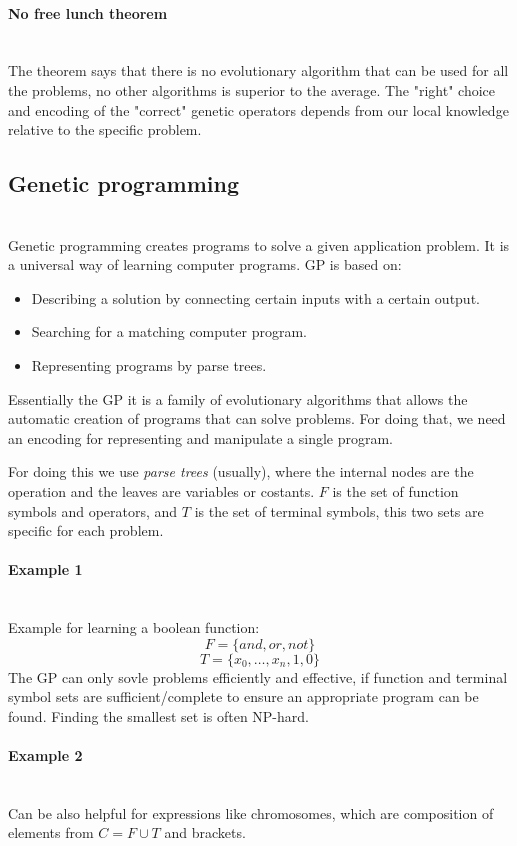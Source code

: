 \documentclass{article}
\begin{document}
\paragraph{No free lunch theorem}\mbox{}\\
The theorem says that there is no evolutionary algorithm that can be used for all the problems,
no other algorithms is superior to the average. The "right" choice and encoding of the
"correct" genetic operators depends from our local knowledge relative to the specific problem.

\subsection{Genetic programming}\mbox{}\\
Genetic programming creates programs to solve a given application problem. It is a universal way
of learning computer programs. GP is based on:
\begin{itemize}
    \item Describing a solution by connecting certain inputs with a certain output.
    \item Searching for a matching computer program.
    \item Representing programs by parse trees.
\end{itemize}
Essentially the GP it is a family of evolutionary algorithms that allows the automatic creation of
programs that can solve problems. For doing that, we need an encoding for representing and
manipulate a single program.

For doing this we use \textit{parse trees} (usually), where the internal nodes are the operation
and the leaves are variables or costants. $F$ is the set of function symbols and operators, and
$T$ is the set of terminal symbols, this two sets are specific for each problem.

\paragraph{Example 1}\mbox{}\\
Example for learning a boolean function:
$$F=\{and, or,not\}$$
$$T=\{x_0,\dots,x_n,1,0\}$$
The GP can only sovle problems efficiently and effective, if function and terminal symbol sets
are sufficient/complete to ensure an appropriate program can be found. Finding the smallest
set is often NP-hard.

\paragraph{Example 2}\mbox{}\\
Can be also helpful for expressions like chromosomes, which are composition of elements from
$C=F\cup T$ and brackets.
\end{document}
